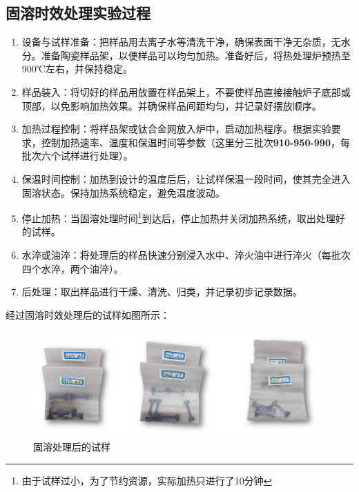 

\subsection{固溶时效处理实验过程}
\begin{enumerate}
	\item 设备与试样准备：把样品用去离子水等清洗干净，确保表面干净无杂质，无水分。准备陶瓷样品架，以便样品可以均匀加热。准备好后，将热处理炉预热至900℃左右，并保持稳定。
	\item 样品装入：将切好的样品用放置在样品架上，不要使样品直接接触炉子底部或顶部，以免影响加热效果。并确保样品间距均匀，并记录好摆放顺序。
	\item 加热过程控制：将样品架或钛合金网放入炉中，启动加热程序。根据实验要求，控制加热速率、温度和保温时间等参数（这里分三批次\textbf{910-950-990}，每批次六个试样进行处理）。
	\item 保温时间控制：加热到设计的温度后后，让试样保温一段时间，使其完全进入固溶状态。保持加热系统稳定，避免温度波动。
	\item 停止加热：当固溶处理时间{\footnote{由于试样过小，为了节约资源，实际加热只进行了10分钟}}到达后，停止加热并关闭加热系统，取出处理好的试样。
	\item 水淬或油淬：将处理后的样品快速分别浸入水中、淬火油中进行淬火（每批次四个水淬，两个油淬）。
	\item 后处理：取出样品进行干燥、清洗、归类，并记录初步记录数据。
\end{enumerate}
经过固溶时效处理后的试样如图所示：

\begin{figure}[h!]
	\centering
	\includegraphics[width=0.7\linewidth]{pic/固溶处理后的试样}
	\caption{固溶处理后的试样}
	\label{fig: aftergurong}
\end{figure}

